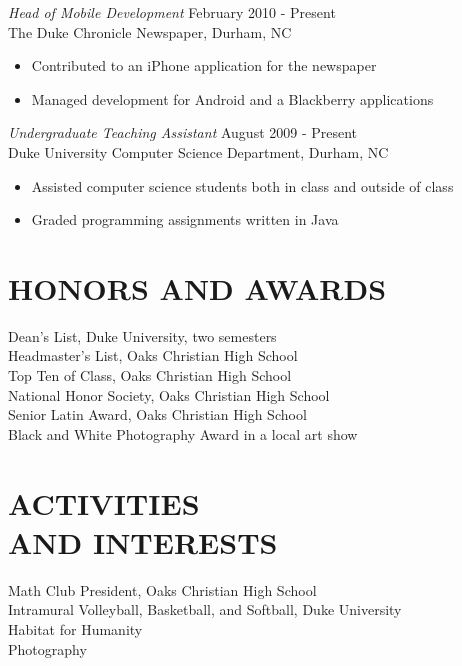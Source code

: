 \documentclass[line,margin]{res}
\begin{document}
\begin{resume}
	{\sl Head of Mobile Development} \hfill February 2010 - Present \\
        The Duke Chronicle Newspaper, Durham, NC
        \begin{itemize}  \itemsep -2pt %
        	\item Contributed to an iPhone application for the newspaper
			\item Managed development for Android and a Blackberry applications
        \end{itemize}

	{\sl Undergraduate Teaching Assistant} \hfill August 2009 - Present \\
        Duke University Computer Science Department, Durham, NC
        \begin{itemize}  \itemsep -2pt %
            \item Assisted computer science students both in class and outside of class
			\item Graded programming assignments written in Java
        \end{itemize}
                

\section{HONORS AND AWARDS}
	Dean's List, Duke University, two semesters \\
	Headmaster's List, Oaks Christian High School \\
	Top Ten of Class, Oaks Christian High School \\
	National Honor Society, Oaks Christian High School \\
	Senior Latin Award, Oaks Christian High School \\
	Black and White Photography Award in a local art show

\section{ACTIVITIES \\ AND INTERESTS}             
 	Math Club President, Oaks Christian High School \\
	Intramural Volleyball, Basketball, and Softball, Duke University \\
	Habitat for Humanity \\
	Photography
\end{resume}
\end{document}
